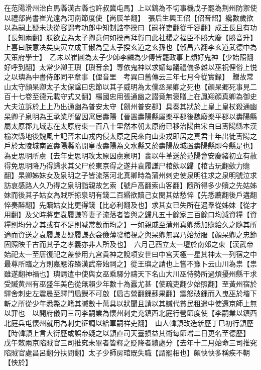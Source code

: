 在范陽滑州治白馬縣漢古縣也許叔冀屯馬】上以鎬為不切事機戊子罷為荆州防禦使以禮部尚書崔光遠為河南節度使【尚辰羊翻】　張后生興王佋【佋音韶】纔數歲欲以為嗣上疑未決從容謂考功郎中知制誥李揆曰【嗣祥吏翻從千容翻】成王長且有功【長知兩翻】朕欲立為太子卿意何如揆再拜賀曰此社稷之福臣不勝大慶【勝音升】上喜曰朕意决矣庚寅立成王俶為皇太子揆玄道之玄孫也【俶昌六翻李玄道武德中為天策府學士】　乙未以崔圓為太子少師李麟為少傅皆罷政事上頗好鬼神【少始照翻好呼到翻】太常少卿王璵【璵音余】專依鬼神以求媚每議禮儀多雜以巫祝俚俗上悦之以璵為中書侍郎同平章事【俚音里　考異曰舊傳云三年七月今從實録】　贈故常山太守顔杲卿太子太保諡曰忠節以其子威明為太僕丞杲卿之死也【顔杲郷死事見二百十七卷至德元載守式又翻】楊國忠用張通幽之譛竟無褒贈上在鳳翔顔真卿為御史大夫泣訴於上上乃出通幽為普安太守【劒州普安郡】具奏其狀於上皇上皇杖殺通幽杲卿子泉明為王承業所留因寓居夀陽【晉置夀陽縣屬樂平郡後魏廢樂平郡以夀陽縣屬太原郡九域志在太原府東一百八十里然本朝太原府已移治陽曲宋白曰夀陽縣本漢榆次縣地後魏風土記晉末山戎内侵太原之民來向山東戎即居之真君十年出徙夀陽之戶於太陵城南置夀陽縣隋開皇改夀陽為文水縣又於夀陽故城置夀陽縣即今縣是也】為史思明所虜【去年史思明攻太原因虜泉明】裹以牛革送於范陽會安慶緒初立有赦得免思明降乃得歸求其父尸於東京得之遂并袁履謙尸棺歛以歸【棺古玩翻歛力贍翻】杲卿姊妹女及泉明之子皆流落河北真卿時為蒲州刺史使泉明往求之泉明號泣求訪哀感路人久乃得之泉明詣親故乞索【號戶高翻索山客翻】隨所得多少贖之先姑姊妹而後其子姑女為賊所掠泉明有錢二百緡欲贖己女閔其姑愁悴【先悉薦翻後戶遘翻悴奏醉翻】先贖姑女比更得錢【比必利翻及也】求其女已失所在遇羣從姊妹【從才用翻】及父時將吏袁履謙等妻子流落者皆與之歸凡五十餘家三百餘口均減資糧【資糧則均分之其或有不足則减常數而均之】一如親戚至蒲州真卿悉加贍給久之隨其所適而資送之袁履謙妻疑履謙衣衾儉薄發棺視之與杲卿無異乃始慙服【顔杲卿之忠節固照映千古而其子之孝義亦非人所及也】　六月己酉立太一壇於南郊之東【漢武帝始祀太一至唐復祀之盖參用九宫貴神之說項安世曰中宫天極一星其神太一列宿之中最尊所臨之方則嘉應洊臻漢武帝始祠之】從王璵之請也上嘗不豫卜云山川為祟【祟雖遂翻神禍也】璵請遣中使與女巫乘驛分禱天下名山大川巫恃勢所過煩擾州縣干求受贓黄州有巫盛年美色從無賴少年數十為蠧尤甚【使疏吏翻少始照翻】至黃州宿於驛舍刺史左震晨至驛門扃鏁不可啟【扃古營翻鏁蘇果翻】震怒破鏁而入曳巫於堦下斬之所從少年悉斃之籍其贓數十萬具以狀聞且請以其贓代貧民租遣中使還京師上無以罪也　以開府儀同三司李嗣業為懷州刺史充鎮西北庭行營節度使【李嗣業以鎮西北庭兵屯懷州就用為刺史征調以給軍嗣祥吏翻】　山人韓頴改造新歷丁巳初行頴歷【時韓頴上言大衍歷或誤帝疑之以頴直司天臺損益其術每節增二日更名至德歷】　戊午敕兩京陷賊官三司推䆒未畢者皆釋之貶降者續處分【去年十二月始命三司推究陷賊官處昌呂翻分扶問翻】太子少師房琯既失職【謂罷相也】頗怏怏多稱疾不朝【怏於】


